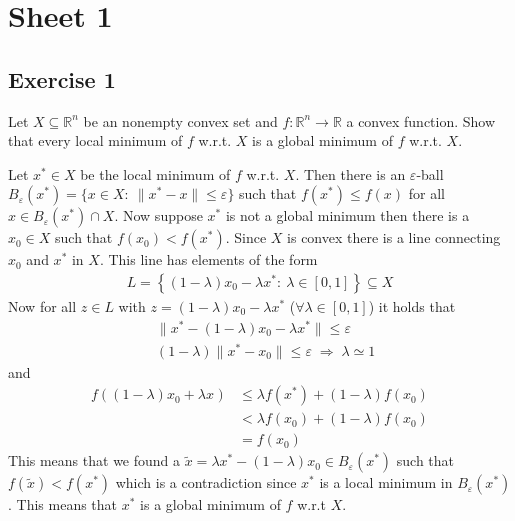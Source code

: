 


\maketitle
\tableofcontents
\section{Sheet 1}
\subsection{Exercise 1}
Let $X \subseteq \mathbb{R}^{n}$ be an nonempty convex set and
$f:\mathbb{R}^{n} \to \mathbb{R}$ a convex function. Show that every local
minimum of $f$ w.r.t. $X$ is a global minimum of $f$ w.r.t. $X$.
\newline

Let $x^{*} \in X$ be the local minimum of $f$ w.r.t. $X$. Then there is an
$\varepsilon$-ball $B_{\varepsilon}(x^{*}) = \{x \in X:\ \|x^{*}- x\|\le
\varepsilon\}$ such that $f(x^{*}) \le f(x)$ for all $x \in
B_\varepsilon(x^{*}) \cap X$. Now suppose $x^{*}$ is not a global minimum
then there is a $x_{0} \in X$ such that $f(x_{0}) < f(x^{*})$. Since $X$ is
convex there is a line connecting $x_{0}$ and $x^{*}$ in $X$. This line has
elements of the form
\begin{align}
    L = \left\{\left( 1-\lambda \right)x_0 - \lambda x^{*}:\ \lambda \in[0,1]
    \right\}
    \subseteq X
\end{align}
Now for all $z \in L$ with $z = (1-\lambda)x_0 - \lambda x^{*}$ ($\forall
\lambda \in [0, 1]$) it holds that
\begin{align}
    &\|x^{*}- (1-\lambda)x_0 - \lambda x^{*}\| \le \varepsilon \\
    &(1-\lambda) \|x^{*}- x_{0}\| \le \varepsilon \; \Rightarrow \; \lambda
    \simeq 1
\end{align}
and
\begin{align}
    f\left( \left( 1-\lambda \right)x_{0} +\lambda x^{} \right)
    &\le \lambda f(x^{*}) + (1-\lambda) f(x_0)\\
    &< \lambda f(x_0) + (1-\lambda)f(x_0)\\
    &= f(x_0)
\end{align}
This means that we found a $\tilde{x} = \lambda x^{*} - (1-\lambda)x_0 \in
B_\varepsilon(x^{*})$ such that $f(\tilde{x}) < f(x^{*})$ which is a
contradiction since $x^{*}$ is a local minimum in $B_\varepsilon(x^{*})$.
This means that $x^{*}$ is a global minimum of $f$ w.r.t $X$.
